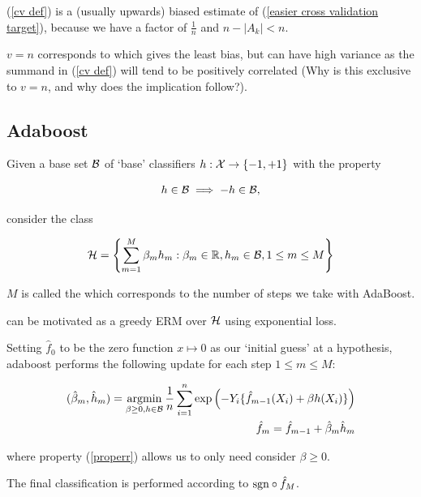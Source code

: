 \documentclass[11pt]{scrartcl}
\begin{document}
\begin{remark}
(\ref{cv def}) is a (usually upwards) biased estimate of (\ref{easier cross validation target}), because we have a factor of $\frac1n$ and $n - |A_k| < n$.
\end{remark}

\begin{remark}
$v=n$ corresponds to  which gives the least bias, but can have high variance as the summand in (\ref{cv def}) will tend to be positively correlated (Why is this exclusive to $v=n$, and why does the implication follow?).
\end{remark}

\subsection{Adaboost}

Given a base set $\mathcal{B}$ of `base' classifiers $h : \mathcal{X} \rightarrow \{ -1, +1 \}$ with the property 

\begin{equation}
h \in \mathcal{B} \implies -h \in \mathcal{B},
\label{properr}
\end{equation}

consider the class

\begin{equation}
    \mathcal{H} = \left\{ \sum_{m=1}^M \beta_m h_m : \beta_m \in \mathbb R, h_m \in \mathcal{B}, 1 \le m \le M  \right\}
\end{equation}

$M$ is called the  which corresponds to the number of steps we take with AdaBoost.

 can be
motivated as a greedy ERM over $\mathcal{H}$ using exponential loss.

Setting $\hat{f}_0$ to be the zero function $x \mapsto 0$ as our `initial guess' at a hypothesis, adaboost performs the following update for each step $1 \le m \le M$:

\begin{align}
    (\hat{\beta}_m, \hat{h}_m) = \operatorname*{arg min}_{\beta \ge 0 , h \in \mathcal{B}} \frac1n \sum_{i=1}^n \text{exp} \left(  -Y_i \{ \hat{f}_{m-1} (X_i) + \beta h(X_i) \}  \right) \\
    \hat{f}_m = \hat{f}_{m-1} + \hat{\beta}_m \hat{h}_m
\label{adaboost update}
\end{align}

where property (\ref{properr}) allows us to only need consider $\beta \ge 0$.

The final classification is performed according to $\text{sgn} \circ \hat{f}_M$.
\end{document}
